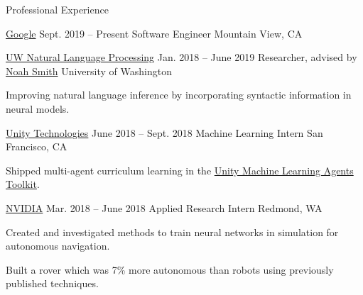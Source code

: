 \documentclass{resume}
\begin{document}
\begin{rSection}{Professional Experience}
  \begin{rSubheader}{{\href{https://www.google.com/}{Google}}}
                     {Sept. 2019 -- Present}
                     {Software Engineer}
                     {Mountain View, CA}
  \end{rSubheader}

  \begin{rSubsection}{\href{https://nlp.washington.edu/}
                           {UW Natural Language Processing}}
                     {Jan. 2018 -- June 2019}
                     {Researcher, advised by
                       \href{https://homes.cs.washington.edu/~nasmith/}
                            {Noah Smith}}
                     {University of Washington}
    \item Improving natural language inference by incorporating syntactic
      information in neural models.
  \end{rSubsection}

  \begin{rSubsection}{{\href{https://unity3d.ai/}{Unity Technologies}}}
                      {June 2018 -- Sept. 2018}
                      {Machine Learning Intern}
                      {San Francisco, CA}
    \item Shipped multi-agent curriculum learning in the
      \href{https://github.com/Unity-Technologies/ml-agents}
           {Unity Machine Learning Agents Toolkit}.
  \end{rSubsection}

  \begin{rSubsection}{{\href{http://www.nvidia.com/page/home.html}{NVIDIA}}}
                      {Mar. 2018 -- June 2018}
                      {Applied Research Intern}
                      {Redmond, WA}
    \item Created and investigated methods to train neural networks in
      simulation for autonomous navigation.
    \item Built a rover which was 7\% more autonomous than robots using
      previously published techniques.
  \end{rSubsection}


\end{rSection}
\end{document}
